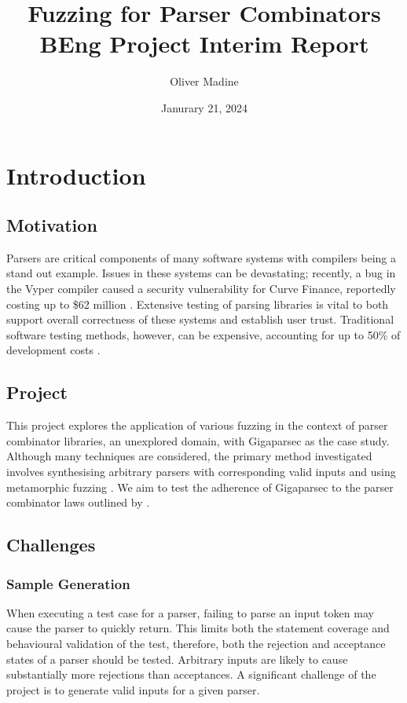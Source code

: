 \documentclass[11pt]{article}
\title{Fuzzing for Parser Combinators \\ {\large BEng Project Interim Report}}
\author{Oliver Madine}
\date{Janurary 21, 2024}
\let\oldciteauthor\citeauthor
\renewcommand{\citeauthor}[1]{\oldciteauthor{#1} \cite{#1}}
\begin{document}
\maketitle

\section{Introduction}

\subsection{Motivation}
Parsers are critical components of many software systems with compilers being a stand out example. Issues in these systems can be devastating; recently, a bug in the Vyper compiler caused a security vulnerability for Curve Finance, reportedly costing up to \$62 million \cite{curve}. Extensive testing of parsing libraries is vital to both support overall correctness of these systems and establish user trust. Traditional software testing methods, however, can be expensive, accounting for up to 50\% of development costs \cite{quickcheck}.

\subsection{Project}
This project explores the application of various fuzzing in the context of parser combinator libraries, an unexplored domain, with Gigaparsec \cite{gigaparsec} as the case study. Although many techniques are considered, the primary method investigated involves synthesising arbitrary parsers with corresponding valid inputs and using metamorphic fuzzing \cite{metamorphic}. We aim to test the adherence of Gigaparsec to the parser combinator laws outlined by \citeauthor{parsley}.

\subsection{Challenges}

\subsubsection{Sample Generation}
When executing a test case for a parser, failing to parse an input token may cause the parser to quickly return. This limits both the statement coverage and behavioural validation of the test, therefore, both the rejection and acceptance states of a parser should be tested. Arbitrary inputs are likely to cause substantially more rejections than acceptances. A significant challenge of the project is to generate valid inputs for a given parser. 
\end{document}

